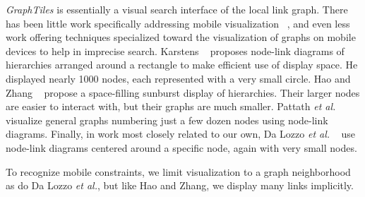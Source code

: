 \textit{GraphTiles} is essentially a visual search interface of the local link graph. There has been little work specifically addressing mobile visualization ~\cite{RefWorks:658}, and even less work offering techniques specialized toward the visualization of graphs on mobile devices to help in imprecise search. Karstens ~\cite{RefWorks:908} proposes node-link diagrams of hierarchies arranged around a rectangle to make efficient use of display space. He displayed nearly 1000 nodes, each represented with a very small circle. Hao and Zhang ~\cite{RefWorks:906} propose a space-filling sunburst display of hierarchies. Their larger nodes are easier to interact with, but their graphs are much smaller. Pattath \textit{et al.} ~\cite{RefWorks:896} visualize general graphs numbering just a few dozen nodes using node-link diagrams. Finally, in work most closely related to our own, Da Lozzo \textit{et al.} ~\cite{springerlink:10.1007/978-3-642-18469-7-14} use node-link diagrams centered around a specific node, again with very small nodes. 

To recognize mobile constraints, we limit visualization to a graph neighborhood as do Da Lozzo \textit{et al.}, but like Hao and Zhang, we display many links implicitly.

